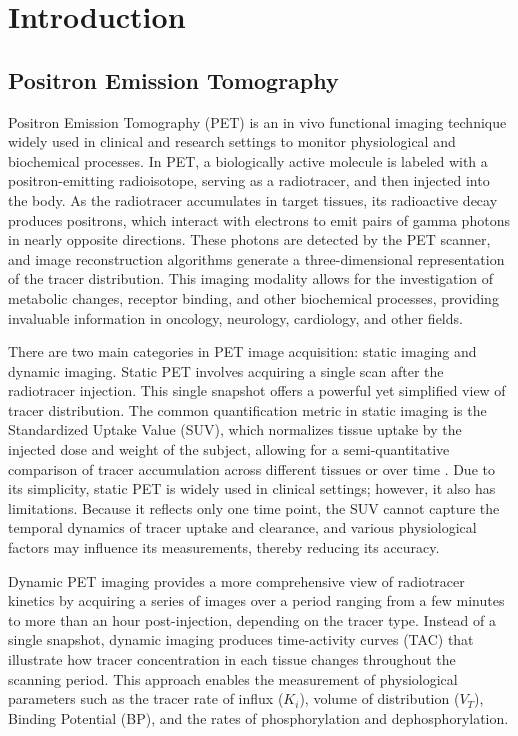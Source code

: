 \chapter{Introduction}

\section{Positron Emission Tomography}
Positron Emission Tomography (PET) is an in vivo functional imaging technique widely used in clinical and research settings to monitor physiological and biochemical processes.
In PET, a biologically active molecule is labeled with a positron-emitting radioisotope, serving as a radiotracer, and then injected into the body.
As the radiotracer accumulates in target tissues, its radioactive decay produces positrons, which interact with electrons to emit pairs of gamma photons in nearly opposite directions.
These photons are detected by the PET scanner, and image reconstruction algorithms generate a three-dimensional representation of the tracer distribution.
This imaging modality allows for the investigation of metabolic changes, receptor binding, and other biochemical processes, providing invaluable information in oncology, neurology, cardiology, and other fields.

There are two main categories in PET image acquisition: static imaging and dynamic imaging.
Static PET involves acquiring a single scan after the radiotracer injection.
This single snapshot offers a powerful yet simplified view of tracer distribution.
The common quantification metric in static imaging is the Standardized Uptake Value (SUV), which normalizes tissue uptake by the injected dose and weight of the subject, allowing for a semi-quantitative comparison of tracer accumulation across different tissues or over time \cite{keyes1995suv}.
Due to its simplicity, static PET is widely used in clinical settings; however, it also has limitations.
Because it reflects only one time point, the SUV cannot capture the temporal dynamics of tracer uptake and clearance, and various physiological factors may influence its measurements, thereby reducing its accuracy.

Dynamic PET imaging provides a more comprehensive view of radiotracer kinetics by acquiring a series of images over a period ranging from a few minutes to more than an hour post-injection, depending on the tracer type.
Instead of a single snapshot, dynamic imaging produces time-activity curves (TAC) that illustrate how tracer concentration in each tissue changes throughout the scanning period.
This approach enables the measurement of physiological parameters such as the tracer rate of influx (\(K_i\)), volume of distribution (\(V_T\)), Binding Potential (BP), and the rates of phosphorylation and dephosphorylation.

